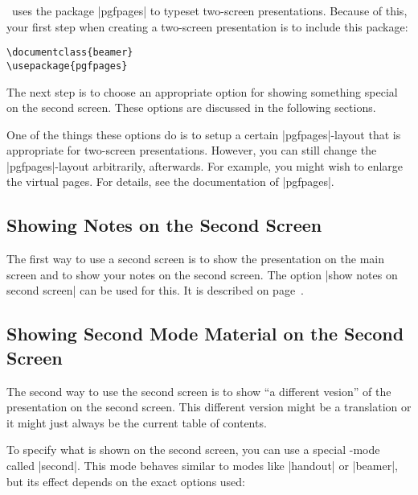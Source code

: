 \beamer\ uses the package |pgfpages| to typeset two-screen presentations. Because of this, your first step when creating a two-screen presentation is to include this package:
\begin{verbatim}
\documentclass{beamer}
\usepackage{pgfpages}
\end{verbatim}

The next step is to choose an appropriate option for showing something special on the second screen. These options are discussed in the following sections.

One of the things these options do is to setup a certain |pgfpages|-layout that is appropriate for two-screen presentations. However, you can still change the |pgfpages|-layout arbitrarily, afterwards. For example, you might wish to enlarge the virtual pages. For details, see the documentation of |pgfpages|.


\subsection{Showing Notes on the Second Screen}

The first way to use a second screen is to show the presentation on the main screen and to show your notes on the second screen. The option |show notes on second screen| can be used for this. It is described on page~\pageref{command-notesonsecondscreen}.


\subsection{Showing Second Mode Material on the Second Screen}

The second way to use the second screen is to show ``a different vesion'' of the presentation on the second screen. This different version might be a translation or it might just always be the current table of contents.

To specify what is shown on the second screen, you can use a special \beamer-mode called |second|. This mode behaves similar to modes like |handout| or |beamer|, but its effect depends on the exact options used:


